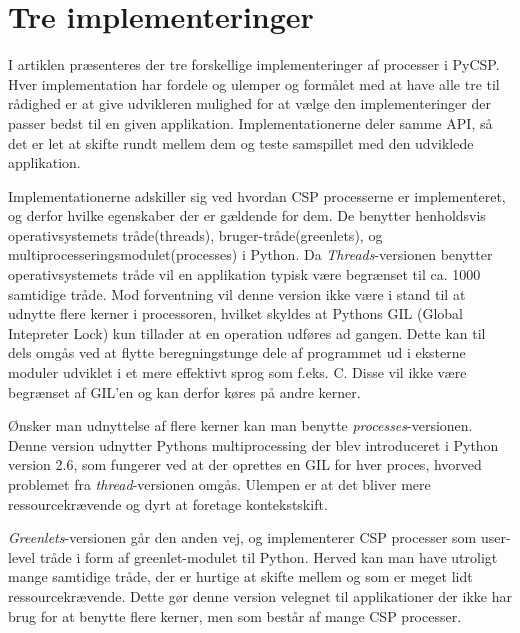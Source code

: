 \section{Tre implementeringer}
I artiklen \cite{Friborg2009} præsenteres der tre forskellige implementeringer af processer i PyCSP. Hver implementation har fordele og ulemper og formålet med at have alle tre til rådighed er at give udvikleren mulighed for at vælge den implementeringer der passer bedst til en given applikation. Implementationerne deler samme API, så det er let at skifte rundt mellem dem og teste samspillet med den udviklede applikation. 

Implementationerne adskiller sig ved hvordan CSP processerne er implementeret, og derfor hvilke egenskaber der er gældende for dem. De benytter henholdsvis operativsystemets tråde(threads), bruger-tråde(greenlets), og multiprocesseringsmodulet(processes) i Python. Da \emph{Threads}-versionen benytter operativsystemets tråde vil en applikation typisk være begrænset til ca. 1000 samtidige tråde\cite[3]{Friborg2009}. Mod forventning vil denne version ikke være i stand til at udnytte flere kerner i processoren, hvilket skyldes at Pythons GIL (Global Intepreter Lock) kun tillader at en operation udføres ad gangen. Dette kan til dels omgås ved at flytte beregningstunge dele af programmet ud i eksterne moduler udviklet i et mere effektivt sprog som f.eks. C. Disse vil ikke være begrænset af GIL'en og kan derfor køres på andre kerner. 

Ønsker man udnyttelse af flere kerner kan man benytte \emph{processes}-versionen. Denne version udnytter Pythons multiprocessing der blev introduceret i Python version 2.6, som fungerer ved at der oprettes en GIL for hver proces, hvorved problemet fra \emph{thread}-versionen omgås. Ulempen er at det bliver mere ressourcekrævende og dyrt at foretage kontekstskift. 

\emph{Greenlets}-versionen går den anden vej, og implementerer CSP processer som user-level tråde i form af greenlet-modulet til Python\cite{greenlet}. Herved kan man have utroligt mange samtidige tråde, der er hurtige at skifte mellem og som er meget lidt ressourcekrævende. Dette gør denne version velegnet til applikationer der ikke har brug for at benytte flere kerner, men som består af mange CSP processer. 

